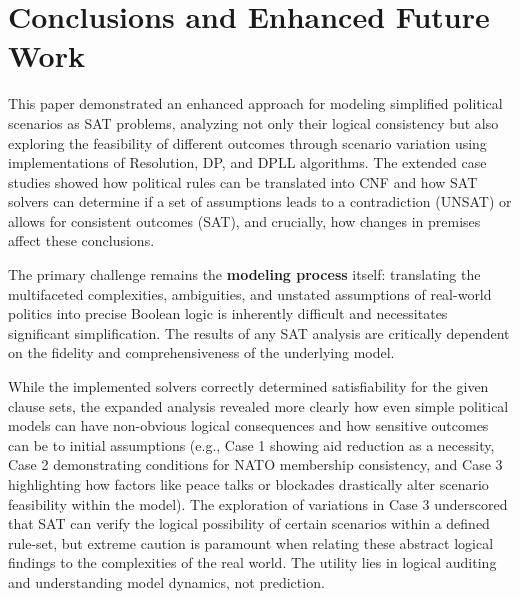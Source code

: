 \documentclass[11pt, a4paper]{article}
\begin{document}
\section{Conclusions and Enhanced Future Work} \label{sec:conclusions}

This paper demonstrated an enhanced approach for modeling simplified political scenarios as SAT problems, analyzing not only their logical consistency but also exploring the feasibility of different outcomes through scenario variation using implementations of Resolution, DP, and DPLL algorithms. The extended case studies showed how political rules can be translated into CNF and how SAT solvers can determine if a set of assumptions leads to a contradiction (UNSAT) or allows for consistent outcomes (SAT), and crucially, how changes in premises affect these conclusions.

The primary challenge remains the \textbf{modeling process} itself: translating the multifaceted complexities, ambiguities, and unstated assumptions of real-world politics into precise Boolean logic is inherently difficult and necessitates significant simplification. The results of any SAT analysis are critically dependent on the fidelity and comprehensiveness of the underlying model.

While the implemented solvers correctly determined satisfiability for the given clause sets, the expanded analysis revealed more clearly how even simple political models can have non-obvious logical consequences and how sensitive outcomes can be to initial assumptions (e.g., Case 1 showing aid reduction as a necessity, Case 2 demonstrating conditions for NATO membership consistency, and Case 3 highlighting how factors like peace talks or blockades drastically alter scenario feasibility within the model). The exploration of variations in Case 3 underscored that SAT can verify the logical possibility of certain scenarios within a defined rule-set, but extreme caution is paramount when relating these abstract logical findings to the complexities of the real world. The utility lies in logical auditing and understanding model dynamics, not prediction.
\end{document}
